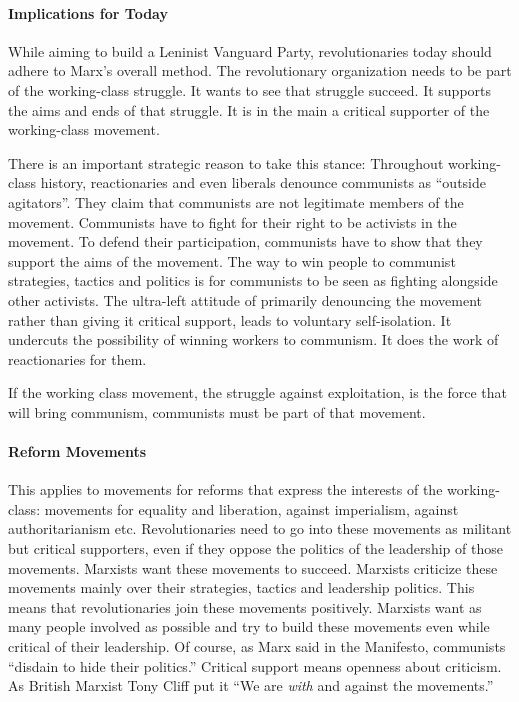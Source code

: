 \paragraph{Implications for Today}

While aiming to build a Leninist Vanguard Party, revolutionaries today should adhere to Marx's overall method. The revolutionary organization needs to be part of the working-class struggle. It wants to see that struggle succeed. It supports the aims and ends of that struggle. It is in the main a critical supporter of the working-class movement.

There is an important strategic reason to take this stance: Throughout working-class history, reactionaries and even liberals denounce communists as ``outside agitators''. They claim that communists are not legitimate members of the movement. Communists have to fight for their right to be activists in the movement. To defend their participation, communists have to show that they support the aims of the movement. The way to win people to communist strategies, tactics and politics is for communists to be seen as fighting alongside other activists. The ultra-left attitude of primarily denouncing the movement rather than giving it critical support, leads to voluntary self-isolation. It undercuts the possibility of winning workers to communism. It does the work of reactionaries for them.

If the working class movement, the struggle against exploitation, is the force that will bring communism, communists must be part of that movement.

\paragraph{Reform Movements}

This applies to movements for reforms that express the interests of the working-class: movements for equality and liberation, against imperialism, against authoritarianism etc. Revolutionaries need to go into these movements as militant but critical supporters, even if they oppose the politics of the leadership of those movements. Marxists want these movements to succeed. Marxists criticize these movements mainly over their strategies, tactics and leadership politics. This means that revolutionaries join these movements positively. Marxists want as many people involved as possible and try to build these movements even while critical of their leadership. Of course, as Marx said in the Manifesto, communists ``disdain to hide their politics.'' Critical support means openness about criticism. As British Marxist Tony Cliff put it ``We are \emph{with} and against the movements.''


